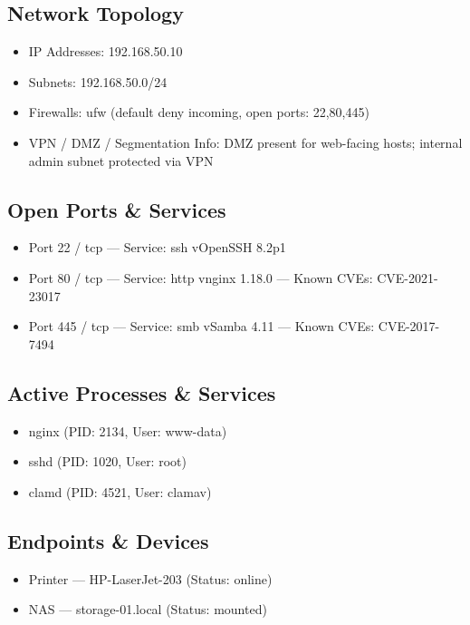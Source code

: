 \documentclass[a4paper,12pt]{article}
\begin{document}
\subsection*{Network Topology}
\begin{itemize}
    \item IP Addresses: 192.168.50.10
    \item Subnets: 192.168.50.0/24
    \item Firewalls: ufw (default deny incoming, open ports: 22,80,445)
    \item VPN / DMZ / Segmentation Info: DMZ present for web-facing hosts; internal admin subnet protected via VPN
\end{itemize}

\subsection*{Open Ports \& Services}
\begin{itemize}
    
    \item Port 22 / tcp — Service: ssh vOpenSSH 8.2p1
    
    \item Port 80 / tcp — Service: http vnginx 1.18.0 — Known CVEs: CVE-2021-23017
    
    \item Port 445 / tcp — Service: smb vSamba 4.11 — Known CVEs: CVE-2017-7494
    
\end{itemize}

\subsection*{Active Processes \& Services}
\begin{itemize}
    
        \item nginx (PID: 2134, User: www-data)
    
        \item sshd (PID: 1020, User: root)
    
        \item clamd (PID: 4521, User: clamav)
    
\end{itemize}

\subsection*{Endpoints \& Devices}
\begin{itemize}
    
        \item Printer — HP-LaserJet-203 (Status: online)
    
        \item NAS — storage-01.local (Status: mounted)
    
\end{itemize}
\end{document}
